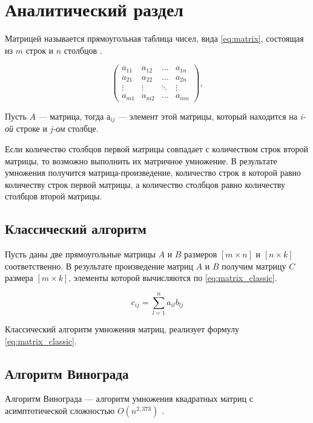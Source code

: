 \chapter{Аналитический раздел}

Матрицей называется прямоугольная таблица чисел, вида \eqref{eq:matrix}, состоящая из $m$ строк и $n$ столбцов \cite{matrix}.

\begin{equation}
	\label{eq:matrix}
	\begin{pmatrix}
		a_{11} & a_{12} & \ldots & a_{1n}\\
		a_{21} & a_{22} & \ldots & a_{2n}\\
		\vdots & \vdots & \ddots & \vdots\\
		a_{m1} & a_{m2} & \ldots & a_{mn}
	\end{pmatrix},
\end{equation}

Пусть $A$ --- матрица, тогда $а_{ij}$ --- элемент этой матрицы, который находится на \textit{i-ой} строке и \textit{j-ом} столбце.

Если количество столбцов первой матрицы совпадает с количеством строк второй матрицы, то возможно выполнить их матричное умножение.
В результате умножения получится матрица-произведение, количество строк в которой равно количеству строк первой матрицы, а количество столбцов равно количеству столбцов второй матрицы.

\section{Классический алгоритм}

Пусть даны две прямоугольные матрицы $A$ и $B$ размеров $[m \times n]$ и $[n \times k]$ соответственно. В результате произведение матриц $A$ и $B$ получим матрицу $C$ размера $[m \times k]$, элементы которой вычисляются по \eqref{eq:matrix_classic}.

\begin{equation}
	\label{eq:matrix_classic}
	c_{ij} = \sum_{l=1}^{n}a_{il}b_{lj}
\end{equation}

Классический алгоритм умножения матриц, реализует формулу \eqref{eq:matrix_classic}.

\section{Алгоритм Винограда}

Алгоритм Винограда --- алгоритм умножения квадратных матриц с асимптотической сложностью $O(n^{2,373})$ \cite{book_vinograd}.

